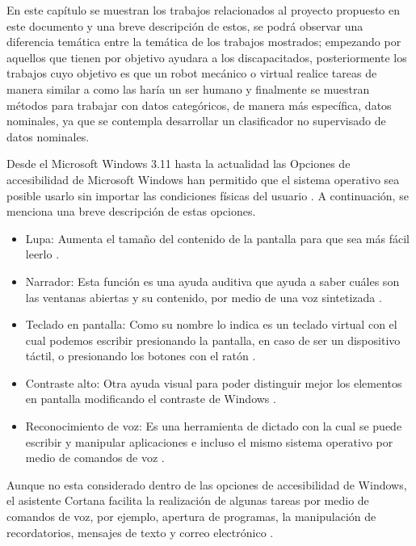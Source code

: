 En este capítulo se muestran los trabajos relacionados al proyecto propuesto
 en este documento y una breve descripción de estos, se podrá observar una
 diferencia temática entre la temática de los trabajos mostrados; empezando 
 por aquellos que tienen por objetivo ayudara a los discapacitados, 
 posteriormente los trabajos cuyo objetivo es que un robot mecánico o virtual 
 realice tareas de manera similar a como las haría un ser humano y finalmente 
 se muestran métodos para trabajar con datos categóricos, de manera más 
 específica, datos nominales, ya que se contempla desarrollar un clasificador 
 no supervisado de datos nominales.

Desde el Microsoft Windows 3.11 \cite{RomeroZunica1998} hasta la actualidad las 
 Opciones de accesibilidad de Microsoft Windows han permitido que el
 sistema operativo sea posible usarlo sin importar las condiciones físicas del
 usuario \cite{DanielHubbell2016}. A continuación, se menciona una breve 
 descripción de estas opciones.

\begin{itemize}
	\item Lupa: Aumenta el tamaño del contenido de la pantalla para que sea más
	 fácil leerlo \cite{xatakaaccesiblilidad}.
	\item Narrador:  Esta función es una ayuda auditiva que ayuda a saber cuáles
	 son las ventanas abiertas y su contenido, por medio de una voz sintetizada
	 \cite{xatakaaccesiblilidad}.
	\item Teclado en pantalla: Como su nombre lo indica es un teclado virtual
	 con el cual podemos escribir presionando la pantalla, en caso de ser un
	 dispositivo táctil, o presionando los botones con el ratón
	 \cite{xatakaaccesiblilidad}.
	 \item Contraste alto: Otra ayuda visual para poder distinguir mejor los
	  elementos en pantalla modificando el contraste de Windows
	  \cite{xatakaaccesiblilidad}.
	  \item Reconocimiento de voz: Es una herramienta de dictado con la cual se
	   puede escribir y manipular aplicaciones e incluso el mismo sistema
	   operativo por medio de comandos de voz \cite{support14213}.
\end{itemize}
	   
Aunque no esta considerado dentro de las opciones de accesibilidad de Windows,
 el asistente Cortana facilita la realización de algunas tareas por medio de
 comandos de voz, por ejemplo, apertura de programas, la manipulación de
 recordatorios, mensajes de texto y correo electrónico \cite{support17214}. 

